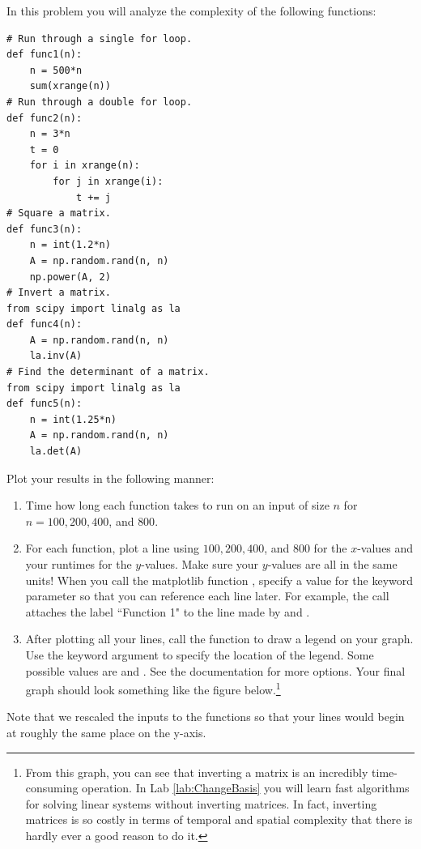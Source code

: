 \begin{problem}\label{prob:complexity_problem}
In this problem you will analyze the complexity of the following functions:

\begin{lstlisting}
# Run through a single for loop.
def func1(n):
    n = 500*n
    sum(xrange(n))
# Run through a double for loop.
def func2(n):
    n = 3*n
    t = 0
    for i in xrange(n):
        for j in xrange(i):
            t += j
# Square a matrix.
def func3(n):
    n = int(1.2*n)
    A = np.random.rand(n, n)
    np.power(A, 2)
# Invert a matrix.
from scipy import linalg as la
def func4(n):
    A = np.random.rand(n, n)
    la.inv(A)
# Find the determinant of a matrix.
from scipy import linalg as la
def func5(n):
    n = int(1.25*n)
    A = np.random.rand(n, n)
    la.det(A)
\end{lstlisting}

Plot your results in the following manner:
\begin{enumerate}
\item Time how long each function takes to run on an input of size $n$ for $n=100, 200, 400$, and $800$.
\item For each function, plot a line using $100, 200, 400$, and $800$ for the $x$-values and your runtimes for the $y$-values. Make sure your $y$-values are all in the same units! When you call the matplotlib function , specify a value for the keyword parameter  so that you can reference each line later. For example, the call  attaches the label ``Function 1" to the line made by  and .
\item After plotting all your lines, call the function  to draw a legend on your graph. Use the keyword argument  to specify the location of the legend. Some possible values are  and . See the documentation for more options. Your final graph should look something like the figure below.\footnote{From this graph, you can see that inverting a matrix is an incredibly time-consuming operation. In Lab \ref{lab:ChangeBasis} you will learn fast algorithms for solving linear systems without inverting matrices. In fact, inverting matrices is so costly in terms of temporal and spatial complexity that there is hardly ever a good reason to do it.}
\end{enumerate}
Note that we rescaled the inputs to the functions so that your lines would begin at roughly the same place on the y-axis.


\end{problem}
